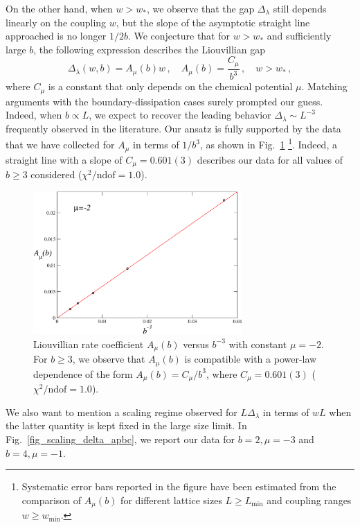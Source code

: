 On the other hand, when $w>w_*$, we observe that the gap $\Delta_\lambda$ still depends linearly on the coupling $w$, but the slope of the asymptotic straight line approached is no longer $1/2b$. We conjecture that for $w>w_*$ and sufficiently large $b$, the following expression describes the Liouvillian gap
\begin{equation}
    \Delta_\lambda(w, b)=A_\mu(b) w\,,\quad A_\mu(b)=\frac{C_\mu}{b^{3}}\,,\quad w>w_*\,,
    \label{eq_liouvillian_gap_largeL}
\end{equation}
where $C_\mu$ is a constant that only depends on the chemical potential $\mu$. Matching arguments with the boundary-dissipation cases surely prompted our guess. Indeed, when $b\propto L$, we expect to recover the leading behavior $\Delta_\lambda\sim L^{-3}$ frequently observed in the literature. Our ansatz is fully supported by the data that we have collected for $A_\mu$ in terms of $1/b^{3}$, as shown in Fig.~\ref{fig_ratelatetime} \footnote{Systematic error bars reported in the figure have been estimated from the comparison of $A_\mu(b)$ for different lattice sizes $L\geq L_{\text{min}}$ and coupling ranges $w\geq w_{\text{min}}$.}. Indeed, a straight line with a slope of $C_\mu=0.601(3)$ describes our data for all values of $b\geq3$ considered ($\chi^2/\text{ndof}=1.0$).  

\begin{figure}
    \centering
    \includegraphics[width=8cm]{imm/ratelatetime.pdf}
    \caption{Liouvillian rate coefficient $A_{\mu}(b)$ versus $b^{-3}$ with constant $\mu=-2$. For $b\geq3$, we observe that $A_{\mu}(b)$ is compatible with a power-law dependence of the form $A_{\mu}(b)=C_{\mu}/b^{3}$, where $C_{\mu}=0.601(3)$ ($\chi^2/\text{ndof}=1.0$).}
    \label{fig_ratelatetime}
\end{figure}

We also want to mention a scaling regime observed for $L\Delta_\lambda$ in terms of $w L$ when the latter quantity is kept fixed in the large size limit. In Fig.~\ref{fig_scaling_delta_apbc}, we report our data for $b=2, \mu=-3$ and $b=4, \mu=-1$.


